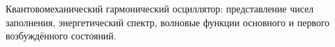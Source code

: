 \documentclass[__main__.tex]{subfiles}
\begin{document}
Квантовомеханический гармонический осциллятор: представление чисел заполнения, энергетический спектр, волновые функции основного и первого возбуждённого состояний.\\ 

\end{document}
